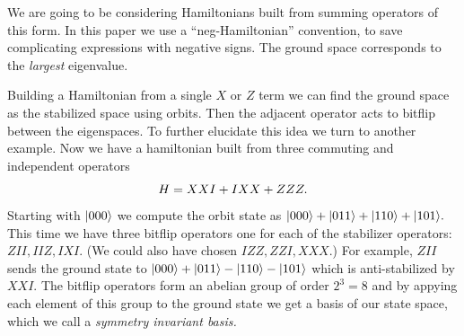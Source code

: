 We are going to be considering Hamiltonians built from
summing operators of this form.
In this paper we use a ``neg-Hamiltonian'' convention,
to save complicating expressions with negative signs.
The ground space corresponds to the \emph{largest} eigenvalue.

Building a Hamiltonian from a single $X$ or $Z$ term
we can find the ground space as the stabilized space
using orbits. Then the adjacent operator acts to bitflip
between the eigenspaces.
To further elucidate this idea we turn to another example.
Now we have a hamiltonian built from three commuting and
independent operators 
$$
    H = XXI + IXX + ZZZ.
$$
Starting with $|{000}\rangle$ we compute the orbit state
as $|{000}\rangle+|{011}\rangle+|{110}\rangle+|{101}\rangle.$
This time we have three bitflip operators
one for each of the stabilizer operators:
$ZII, IIZ, IXI.$
(We could also have chosen $IZZ, ZZI, XXX.$)
For example, $ZII$ sends the ground state to
$|{000}\rangle+|{011}\rangle-|{110}\rangle-|{101}\rangle$
which is anti-stabilized by $XXI.$
The bitflip operators form an abelian group of
order $2^3 = 8$ and by appying each element of
this group to the ground state we get a basis
of our state space, which we call a \emph{symmetry
invariant basis.}

